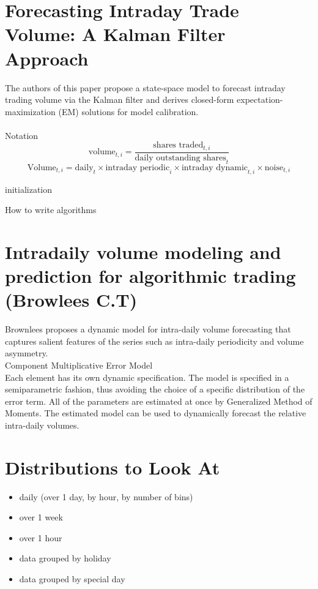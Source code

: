 \documentclass[11pt]{article}
\begin{document}
\section{Forecasting Intraday Trade Volume: A Kalman Filter Approach}
The authors of this paper propose a state-space model to forecast intraday trading volume via the Kalman filter and derives closed-form expectation-maximization (EM) solutions for model calibration.
\\\\Notation
\\$$\text{volume}_{t,i} = \frac{\text{shares traded}_{t,i}}{\text{daily outstanding shares}_t}$$
$$\text{Volume}_{t,i} = \text{daily}_{t} \times \text{intraday periodic}_i \times \text{intraday dynamic}_{t,i} \times \text{noise}_{t,i}$$


\begin{algorithm}[H]
\SetAlgoLined
{}
 initialization\;
 \caption{How to write algorithms}
\end{algorithm}


\section{Intradaily volume modeling and prediction for algorithmic trading (Browlees C.T)}
Brownlees proposes a dynamic model for intra-daily volume forecasting that captures salient features of the series such as intra-daily periodicity and volume asymmetry. 
\\Component Multiplicative Error Model
\\Each element has its own dynamic specification. The model is specified in a semiparametric fashion, thus avoiding the choice of a specific distribution of the error term. All of the parameters are estimated at once by Generalized Method of Moments. The estimated model can be used to dynamically forecast the relative intra-daily volumes. 



\section{Distributions to Look At}
\begin{itemize}
\setlength{\itemsep}{0pt}
  \setlength{\parskip}{0pt}
\item daily (over 1 day, by hour, by number of bins)
\item over 1 week
\item over 1 hour
\item data grouped by holiday
\item data grouped by special day
\end{itemize}
\end{document}
